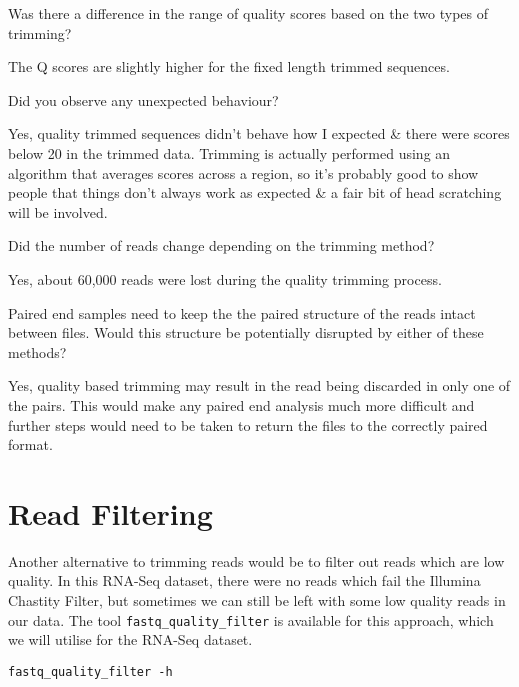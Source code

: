 \begin{questions}
Was there a difference in the range of quality scores based on the two types of trimming? \\
\begin{answer}
The Q scores are slightly higher for the fixed length trimmed sequences. \\
\end{answer}

Did you observe any unexpected behaviour? \\
\begin{answer}
Yes, quality trimmed sequences didn't behave how I expected \& there were scores below 20 in the trimmed data.
Trimming is actually performed using an algorithm that averages scores across a region, so it's probably good to show people that things don't always work as expected \& a fair bit of head scratching will be involved. \\
\end{answer}

Did the number of reads change depending on the trimming method? \\
\begin{answer}
Yes, about 60,000 reads were lost during the quality trimming process. \\
\end{answer}

Paired end samples need to keep the the paired structure of the reads intact between files.
Would this structure be potentially disrupted by either of these methods? \\
\begin{answer}
Yes, quality based trimming may result in the read being discarded in only one of the pairs. 
This would make any paired end analysis much more difficult and further steps would need to be taken to return the files to the correctly paired format.\\
\end{answer}
\end{questions}

\section{Read Filtering}
Another alternative to trimming reads would be to filter out reads which are low quality.
In this RNA-Seq dataset, there were no reads which fail the Illumina Chastity Filter, but sometimes we can still be left with some low quality reads in our data. 
The tool \texttt{fastq\_quality\_filter} is available for this approach, which we will utilise for the RNA-Seq dataset.
\begin{lstlisting}
fastq_quality_filter -h
\end{lstlisting}

